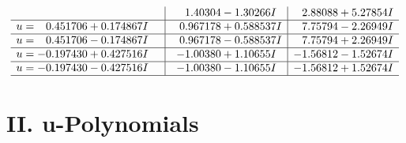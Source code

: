\documentclass[1p]{elsarticle_modified}
\theoremstyle{definition}
\begin{document}
$$\begin{array}{c|c|c}
 & \phantom{-}1.40304 - 1.30266 I & \phantom{-}2.88088 + 5.27854 I \\ \hline\begin{aligned}
u &= \phantom{-}0.451706 + 0.174867 I\end{aligned}
 & \phantom{-}0.967178 + 0.588537 I & \phantom{-}7.75794 - 2.26949 I \\ \hline\begin{aligned}
u &= \phantom{-}0.451706 - 0.174867 I\end{aligned}
 & \phantom{-}0.967178 - 0.588537 I & \phantom{-}7.75794 + 2.26949 I \\ \hline\begin{aligned}
u &= -0.197430 + 0.427516 I\end{aligned}
 & -1.00380 + 1.10655 I & -1.56812 - 1.52674 I \\ \hline\begin{aligned}
u &= -0.197430 - 0.427516 I\end{aligned}
 & -1.00380 - 1.10655 I & -1.56812 + 1.52674 I\\
 \hline 
 \end{array}$$\newpage
\newpage\renewcommand{\arraystretch}{1}
\centering \section*{ II. u-Polynomials}
\end{document}
